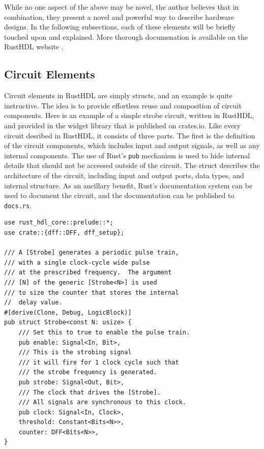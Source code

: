\documentclass[conference]{IEEEtran}
\begin{document}
While no one aspect of the above may be novel, the author believes that in combination, they present a 
novel and powerful way to describe hardware designs.  In the following subsections, each of these 
elements will be briefly touched upon and explained.  More thorough documenation is available on the
RustHDL website \cite{b6}.

\subsection{Circuit Elements}

Circuit elements in RustHDL are simply structs, and an example is quite instructive.  The idea is to
provide effortless reuse and composition of circuit components.  Here is an example of a simple strobe
circuit, written in RustHDL, and provided in the widget library that is published on crates.io.  Like 
every circuit desribed in RustHDL, it consists of three parts.  The first is the definition of the
circuit components, which includes input and output signals, as well as any internal components.
The use of Rust's \verb|pub| mechanism is used to hide internal details that should not be accessed
outside of the circuit.  The struct describes the architecture of the circuit, including
input and output ports, data types, and internal structure.  As an ancillary benefit, Rust's documentation 
system can be used to document the circuit, and the documentation can be published to \verb|docs.rs|.

\begin{verbatim}
use rust_hdl_core::prelude::*;
use crate::{dff::DFF, dff_setup};

/// A [Strobe] generates a periodic pulse train, 
/// with a single clock-cycle wide pulse
/// at the prescribed frequency.  The argument 
/// [N] of the generic [Strobe<N>] is used
/// to size the counter that stores the internal 
//  delay value.  
#[derive(Clone, Debug, LogicBlock)]
pub struct Strobe<const N: usize> {
    /// Set this to true to enable the pulse train.
    pub enable: Signal<In, Bit>,
    /// This is the strobing signal 
    /// it will fire for 1 clock cycle such that 
    /// the strobe frequency is generated.
    pub strobe: Signal<Out, Bit>,
    /// The clock that drives the [Strobe].  
    /// All signals are synchronous to this clock.
    pub clock: Signal<In, Clock>,
    threshold: Constant<Bits<N>>,
    counter: DFF<Bits<N>>,
}
\end{verbatim}
\end{document}
